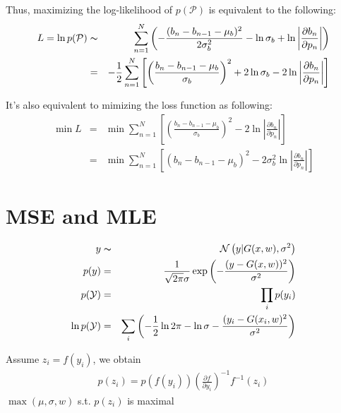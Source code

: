 \documentclass[11pt]{article}
\begin{document}
Thus, maximizing the log-likelihood of \(p(\mathcal{P})\) is equivalent to the following:
\begin{eqnarray}
L = \ln p(\mathcal{P}) &\thicksim& \sum_{n=1}^{N} \left(- \frac{(b_n-b_{n-1}-\mu_{b})^2}{2 \sigma_{b}^2} - \ln \sigma_{b} + \ln \left|\frac{\partial b_n}{\partial p_n}\right|\right) \\
  &=& - \frac{1}{2} \sum_{n=1}^{N} \left[\left(\frac{b_n - b_{n-1} - \mu_{b}}{\sigma_b} \right)^2 + 2 \ln \sigma_{b} - 2 \ln \left|\frac{\partial b_n}{\partial p_n}\right|\right]
\end{eqnarray}

It's also equivalent to mimizing the loss function as following:
\begin{eqnarray}
\min L &=& \min \sum_{n=1}^{N} \left[\left(\frac{b_n - b_{n-1} - \mu_{b}}{\sigma_b} \right)^2 - 2 \ln \left|\frac{\partial b_n}{\partial p_n}\right|\right] \\
       &=& \min \sum_{n=1}^{N} \left[\left( b_n - b_{n-1} - \mu_{b}\right)^2 - 2 \sigma_{b}^2 \ln \left|\frac{\partial b_n}{\partial p_n}\right|\right]
\end{eqnarray}
\section{MSE and MLE}
\label{sec:org9b87db9}
\begin{eqnarray}

y &\thicksim& \mathcal{N} \left( y | G(x, w), \sigma^2 \right) \\
p(y) &=& \frac{1}{\sqrt{2 \pi} \sigma} \exp \left(-\frac{(y-G(x, w))^2}{\sigma^2} \right) \\
p(\mathcal{Y}) &=& \prod_{i} p(y_i) \\
\ln p(\mathcal{Y}) &=& \sum_{i} \left( -\frac{1}{2}\ln 2 \pi - \ln \sigma - \frac{(y_i - G(x_i, w)^2}{\sigma^2} \right)
\end{eqnarray}

Assume \(z_i = f(y_i)\), we obtain
\begin{eqnarray}
p(z_i) = p(f(y_i)) \left(\frac{\partial f}{\partial y_i}\right)^{-1} f^{-1}(z_i)
\end{eqnarray}
\(\max (\mu, \sigma, w)\) s.t. \(p(z_i)\) is maximal \\
\end{document}
